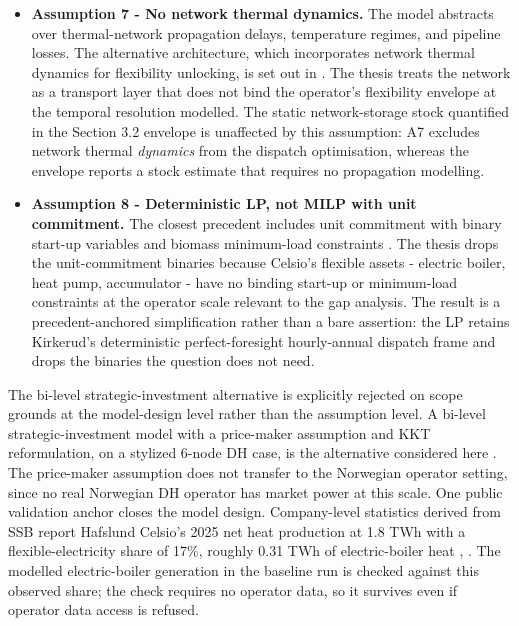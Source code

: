 \begin{itemize}
    \item \textbf{Assumption 7 - No network thermal dynamics.} The model abstracts over thermal-network propagation delays, temperature regimes, and pipeline losses. The alternative architecture, which incorporates network thermal dynamics for flexibility unlocking, is set out in \cite{vandermeulen_controlling_2018}. The thesis treats the network as a transport layer that does not bind the operator's flexibility envelope at the temporal resolution modelled. The static network-storage stock quantified in the Section 3.2 envelope is unaffected by this assumption: A7 excludes network thermal \emph{dynamics} from the dispatch optimisation, whereas the envelope reports a stock estimate that requires no propagation modelling.

    \item \textbf{Assumption 8 - Deterministic LP, not MILP with unit commitment.} The closest precedent includes unit commitment with binary start-up variables and biomass minimum-load constraints \cite{kirkerud_impacts_2016}. The thesis drops the unit-commitment binaries because Celsio's flexible assets - electric boiler, heat pump, accumulator - have no binding start-up or minimum-load constraints at the operator scale relevant to the gap analysis. The result is a precedent-anchored simplification rather than a bare assertion: the LP retains Kirkerud's deterministic perfect-foresight hourly-annual dispatch frame and drops the binaries the question does not need.
\end{itemize}

The bi-level strategic-investment alternative is explicitly rejected on scope grounds at the model-design level rather than the assumption level. A bi-level strategic-investment model with a price-maker assumption and KKT reformulation, on a stylized 6-node DH case, is the alternative considered here \cite{tan_strategic_2022}. The price-maker assumption does not transfer to the Norwegian operator setting, since no real Norwegian DH operator has market power at this scale. One public validation anchor closes the model design. Company-level statistics derived from SSB report Hafslund Celsio's 2025 net heat production at 1.8 TWh with a flexible-electricity share of 17\%, roughly 0.31 TWh of electric-boiler heat \cite{norsk_fjernvarme_fjernkontrollenno_nodate}, \cite{norsk_fjernvarme_fakta_nodate}. The modelled electric-boiler generation in the baseline run is checked against this observed share; the check requires no operator data, so it survives even if operator data access is refused.



